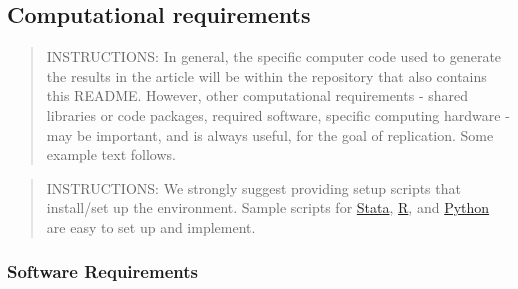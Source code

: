 \documentclass[
]{article}
\begin{document}
\hypertarget{computational-requirements}{%
\subsection{Computational
requirements}\label{computational-requirements}}

\begin{quote}
INSTRUCTIONS: In general, the specific computer code used to generate
the results in the article will be within the repository that also
contains this README. However, other computational requirements - shared
libraries or code packages, required software, specific computing
hardware - may be important, and is always useful, for the goal of
replication. Some example text follows.
\end{quote}

\begin{quote}
INSTRUCTIONS: We strongly suggest providing setup scripts that
install/set up the environment. Sample scripts for
\href{https://github.com/gslab-econ/template/blob/master/config/config_stata.do}{Stata},
\href{https://github.com/labordynamicsinstitute/paper-template/blob/master/programs/global-libraries.R}{R},
and \href{https://pip.readthedocs.io/en/1.1/requirements.html}{Python}
are easy to set up and implement.
\end{quote}

\hypertarget{software-requirements}{%
\subsubsection{Software Requirements}\label{software-requirements}}
\end{document}
